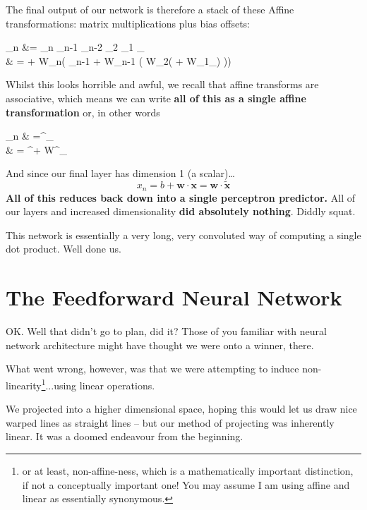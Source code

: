 \documentclass[a4paper,openany,11pt]{book}
\newcommand\cec[1]{\tilde{\vec{#1}}}
\renewcommand\vec[1]{\boldsymbol{\mathbf{#1}}}
\begin{document}
					The final output of our network is therefore a stack of these Affine transformations: matrix multiplications plus bias offsets:
					\begin{spalign}
						\vec{x}_n &= \mathcal{W}_n _{n-1} _{n-2} \cdots {}_2 _1 \vec{x}_
						\\
						& = \vec{b_n} + W_n\left( \vec{b}_{n-1} + W_{n-1} \left( \cdots W_2\left(\vec{b_1} + W_1\vec{x}_\right) \right)\right)
					\end{spalign}
					Whilst this looks horrible and awful, we recall that affine transforms are associative, which means we can write \textbf{all of this as a single affine transformation} or, in other words 
					\begin{spalign}
						\vec{x}_n & =^\prime \vec{x}_\text{input}
						\\
						& = \vec{b}^\prime + W^\prime \vec{x}_\text{input}
					\end{spalign}
					And since our final layer has dimension 1 (a scalar)\dots
					\begin{equation}
						x_n = b + \vec{w} \cdot \vec{x} = \vec{w} \cdot \cec{x}
					\end{equation}
					\textbf{All of this reduces back down into a single perceptron predictor.} All of our layers and increased dimensionality \textbf{did absolutely nothing}. Diddly squat.

					This network is essentially a very long, very convoluted way of computing a single dot product. Well done us. 


			\newpage
			\section{The Feedforward Neural Network}

				OK. Well that didn't go to plan, did it? Those of you familiar with neural network architecture might have thought we were onto a winner, there. 

				What went wrong, however, was that we were attempting to induce non-linearity\footnote{or at least, non-affine-ness, which is a mathematically important distinction, if not a conceptually important one! You may assume I am using affine and linear as essentially synonymous.}...using linear operations. 

				We projected into a higher dimensional space, hoping this would let us draw nice warped lines as straight lines -- but our method of projecting was inherently linear. It was a doomed endeavour from the beginning. 
\end{document}
